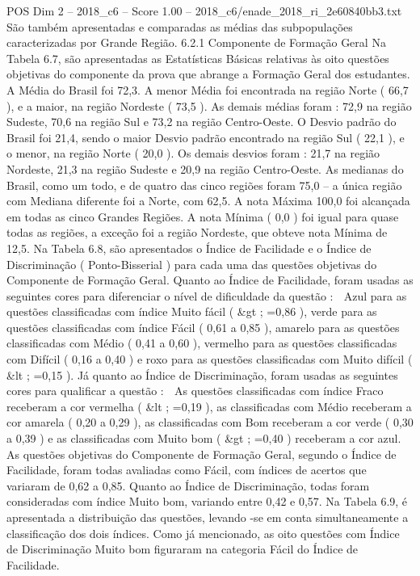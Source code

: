\begin{textsample}{POS Dim 2 – 2018\_c6 – Score 1.00 – 2018\_c6/enade\_2018\_ri\_2e60840bb3.txt}
São também apresentadas e comparadas as médias das subpopulações caracterizadas por Grande Região. 6.2.1 Componente de Formação Geral Na Tabela 6.7, são apresentadas as Estatísticas Básicas relativas às oito questões objetivas do componente da prova que abrange a Formação Geral dos estudantes.
A Média do Brasil foi 72,3.
A menor Média foi encontrada na região Norte ( 66,7 ), e a maior, na região Nordeste ( 73,5 ).
As demais médias foram : 72,9 na região Sudeste, 70,6 na região Sul e 73,2 na região Centro-Oeste.
O Desvio padrão do Brasil foi 21,4, sendo o maior Desvio padrão encontrado na região Sul ( 22,1 ), e o menor, na região Norte ( 20,0 ).
Os demais desvios foram : 21,7 na região Nordeste, 21,3 na região Sudeste e 20,9 na região Centro-Oeste.
As medianas do Brasil, como um todo, e de quatro das cinco regiões foram 75,0 – a única região com Mediana diferente foi a Norte, com 62,5.
A nota Máxima 100,0 foi alcançada em todas as cinco Grandes Regiões.
A nota Mínima ( 0,0 ) foi igual para quase todas as regiões, a exceção foi a região Nordeste, que obteve nota Mínima de 12,5.
Na Tabela 6.8, são apresentados o Índice de Facilidade e o Índice de Discriminação ( Ponto-Bisserial ) para cada uma das questões objetivas do Componente de Formação Geral.
Quanto ao Índice de Facilidade, foram usadas as seguintes cores para diferenciar o nível de dificuldade da questão :  Azul para as questões classificadas com índice Muito fácil ( \&gt ; =0,86 ), verde para as questões classificadas com índice Fácil ( 0,61 a 0,85 ), amarelo para as questões classificadas com Médio ( 0,41 a 0,60 ), vermelho para as questões classificadas com Difícil ( 0,16 a 0,40 ) e roxo para as questões classificadas com Muito difícil ( \&lt ; =0,15 ).
Já quanto ao Índice de Discriminação, foram usadas as seguintes cores para qualificar a questão :  As questões classificadas com índice Fraco receberam a cor vermelha ( \&lt ; =0,19 ), as classificadas com Médio receberam a cor amarela ( 0,20 a 0,29 ), as classificadas com Bom receberam a cor verde ( 0,30 a 0,39 ) e as classificadas com Muito bom ( \&gt ; =0,40 ) receberam a cor azul.
As questões objetivas do Componente de Formação Geral, segundo o Índice de Facilidade, foram todas avaliadas como Fácil, com índices de acertos que variaram de 0,62 a 0,85.
Quanto ao Índice de Discriminação, todas foram consideradas com índice Muito bom, variando entre 0,42 e 0,57.
Na Tabela 6.9, é apresentada a distribuição das questões, levando -se em conta simultaneamente a classificação dos dois índices.
Como já mencionado, as oito questões com Índice de Discriminação Muito bom figuraram na categoria Fácil do Índice de Facilidade.

\end{textsample}
